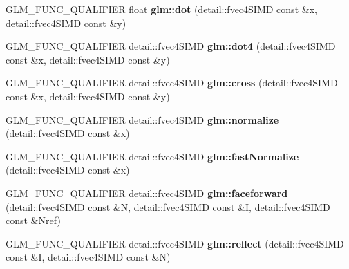 \begin{DoxyCompactItemize}
\item 
\mbox{\label{simd__vec4_8inl_ae84ca0b0e48c6a79faac0eea8bc7a913}} 
G\+L\+M\+\_\+\+F\+U\+N\+C\+\_\+\+Q\+U\+A\+L\+I\+F\+I\+ER float {\bfseries glm\+::dot} (detail\+::fvec4\+S\+I\+MD const \&x, detail\+::fvec4\+S\+I\+MD const \&y)
\item 
\mbox{\label{simd__vec4_8inl_af55916a3764adaa7537f5e3e9ccacb81}} 
G\+L\+M\+\_\+\+F\+U\+N\+C\+\_\+\+Q\+U\+A\+L\+I\+F\+I\+ER detail\+::fvec4\+S\+I\+MD {\bfseries glm\+::dot4} (detail\+::fvec4\+S\+I\+MD const \&x, detail\+::fvec4\+S\+I\+MD const \&y)
\item 
\mbox{\label{simd__vec4_8inl_a06a52dedca29da951493c4c6f6020573}} 
G\+L\+M\+\_\+\+F\+U\+N\+C\+\_\+\+Q\+U\+A\+L\+I\+F\+I\+ER detail\+::fvec4\+S\+I\+MD {\bfseries glm\+::cross} (detail\+::fvec4\+S\+I\+MD const \&x, detail\+::fvec4\+S\+I\+MD const \&y)
\item 
\mbox{\label{simd__vec4_8inl_aabe6e7b8dbd2e5db215f973e474dd951}} 
G\+L\+M\+\_\+\+F\+U\+N\+C\+\_\+\+Q\+U\+A\+L\+I\+F\+I\+ER detail\+::fvec4\+S\+I\+MD {\bfseries glm\+::normalize} (detail\+::fvec4\+S\+I\+MD const \&x)
\item 
\mbox{\label{simd__vec4_8inl_a28640ee202fdb12ef3e836c257675043}} 
G\+L\+M\+\_\+\+F\+U\+N\+C\+\_\+\+Q\+U\+A\+L\+I\+F\+I\+ER detail\+::fvec4\+S\+I\+MD {\bfseries glm\+::fast\+Normalize} (detail\+::fvec4\+S\+I\+MD const \&x)
\item 
\mbox{\label{simd__vec4_8inl_ae3d9637fb22cf7eecd448c5ad341efab}} 
G\+L\+M\+\_\+\+F\+U\+N\+C\+\_\+\+Q\+U\+A\+L\+I\+F\+I\+ER detail\+::fvec4\+S\+I\+MD {\bfseries glm\+::faceforward} (detail\+::fvec4\+S\+I\+MD const \&N, detail\+::fvec4\+S\+I\+MD const \&I, detail\+::fvec4\+S\+I\+MD const \&Nref)
\item 
\mbox{\label{simd__vec4_8inl_aca05cfddf931415f023b4ac91b96d739}} 
G\+L\+M\+\_\+\+F\+U\+N\+C\+\_\+\+Q\+U\+A\+L\+I\+F\+I\+ER detail\+::fvec4\+S\+I\+MD {\bfseries glm\+::reflect} (detail\+::fvec4\+S\+I\+MD const \&I, detail\+::fvec4\+S\+I\+MD const \&N)
\item 
\mbox{\label{simd__vec4_8inl_a6b7db0c107279793b77576c2eef680b3}} 

\end{DoxyCompactItemize}
